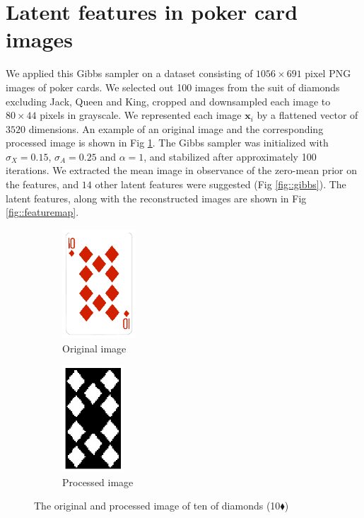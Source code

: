 \documentclass{article}
\begin{document}
\section{Latent features in poker card images}\label{sec::realdata}

We applied this Gibbs sampler on a dataset consisting of $1056\times 691$ pixel PNG images of poker cards. We selected out 100 images from the suit of diamonds excluding Jack, Queen and King, cropped and downsampled each image to $80\times 44$ pixels in grayscale. We represented each image $\boldsymbol{x}_i$ by a flattened vector of $3520$ dimensions. An example of an original image and the corresponding processed image is shown in Fig \ref{fig::sample}. The Gibbs sampler was initialized with $\sigma_X = 0.15$, $\sigma_A = 0.25$ and $\alpha = 1$, and stabilized after approximately 100 iterations. We extracted the mean image in observance of the zero-mean prior on the features, and $14$ other latent features were suggested (Fig \ref{fig::gibbs}). The latent features, along with the reconstructed images are shown in Fig \ref{fig::featuremap}. 

\begin{figure}[!h]
  \centering
  \begin{subfigure}[b]{0.35\textwidth}
    \centering
    \includegraphics[width = 2.75cm]{figures/sample_original.png}
    \caption{Original image}
  \end{subfigure} 
  \begin{subfigure}[b]{0.35\textwidth}
    \centering
    \includegraphics[width = 2.3cm]{figures/sample_cropped.png}
    \caption{Processed image}
  \end{subfigure}
  \caption{The original and processed image of ten of diamonds (10$\blacklozenge$)}
  \label{fig::sample}
\end{figure}
\end{document}
